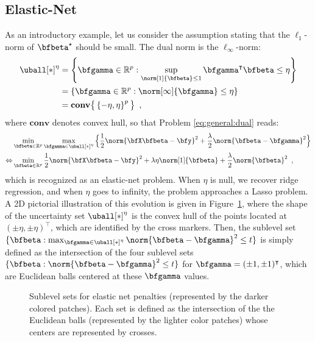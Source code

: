 \subsection{Elastic-Net} \label{sec:elasticnet}

As an introductory example, let us consider the assumption stating that the
$\ell_1$-norm of $\bfbeta^\star$ should be small. 
The dual norm is the $\ell_\infty$-norm:
%
\begin{align*}
  \uball[*]^\eta & = \left\{ \bfgamma \in \mathbb{R}^p :
\sup_{\norm[1]{\bfbeta}\leq1} \bfgamma^\intercal\bfbeta \leq \eta \right\} \\
    & = \left\{ \bfgamma \in \mathbb{R}^p : \norm[\infty]{\bfgamma} \leq \eta \right\} \\
    & = \mathbf{conv} \big\{ \left\{ -\eta, \eta \right\}^p \big\}
  \enspace,
\end{align*}
where $\mathbf{conv}$ denotes convex hull, so that Problem
\eqref{eq:general:dual} reads:
%
\begin{align}
  & \min_{\bfbeta\in\mathbb{R}^p} \max_{\bfgamma \in\uball[*]^\eta}
      \Big\{ \frac{1}{2} \norm{\bfX \bfbeta - \bfy}^2 + \frac{\lambda}{2} \norm{\bfbeta - \bfgamma}^2 
      \Big\} \nonumber \\
  \Leftrightarrow
    & \min_{\bfbeta\in\mathbb{R}^p}
       \frac{1}{2} \norm{\bfX \bfbeta - \bfy}^2 + \lambda \eta
       \norm[1]{\bfbeta} + \frac{\lambda}{2} \norm{\bfbeta}^2
  \enspace, \label{eq:elastic-net}
\end{align}
%
which is recognized as an elastic-net problem.
When $\eta$ is null, we recover ridge regression, and when $\eta$ goes to 
infinity, the problem approaches a Lasso problem.
A 2D pictorial illustration of this evolution is given in
Figure~\ref{fig:en-penalty}, where the shape of the uncertainty set
$\uball[*]^\eta$ is the convex hull of the points located at 
$(\pm \eta, \pm \eta)^\intercal$, which are identified by the cross markers.
Then, the sublevel set 
$\{\bfbeta : \max_{\bfgamma \in \uball[*]^\eta} \norm{\bfbeta-\bfgamma}^2 \leq t\}$
is simply defined as the intersection of the four sublevel sets
$\{\bfbeta : \norm{\bfbeta - \bfgamma}^2 \leq t\}$ for $\bfgamma=(\pm
1, \pm 1)^\intercal$, which are Euclidean balls centered at
these $\bfgamma$ values.
%
\begin{figure}
  \begin{center} 
    \caption{Sublevel sets for elastic net penalties (represented by the darker
             colored patches).  
             Each set is defined as the intersection of the the Euclidean balls
             (represented by the lighter color patches) whose centers are
             represented by crosses.}
    \label{fig:en-penalty}
    \end{center} 
\end{figure}

